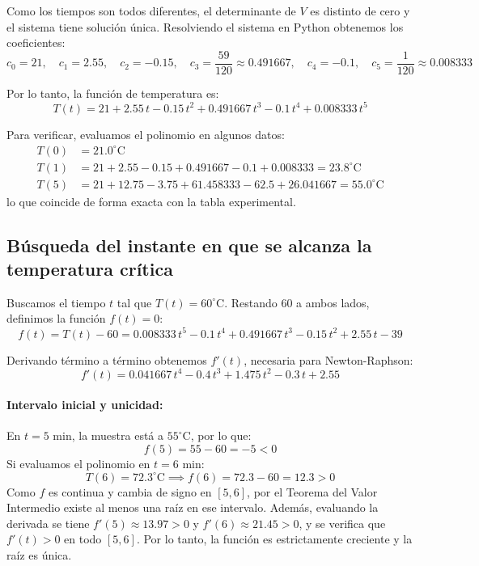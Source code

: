 \documentclass[11pt,a4paper]{article}
\begin{document}
Como los tiempos son todos diferentes, el determinante de $V$ es distinto de cero y el sistema tiene solución única. Resolviendo el sistema en Python obtenemos los coeficientes:
\begin{equation}
    c_0 = 21, \quad c_1 = 2.55, \quad c_2 = -0.15, \quad c_3 = \frac{59}{120} \approx 0.491667, \quad c_4 = -0.1, \quad c_5 = \frac{1}{120} \approx 0.008333
\end{equation}

Por lo tanto, la función de temperatura es:
\begin{equation}
    T(t) = 21 + 2.55\,t - 0.15\,t^2 + 0.491667\,t^3 - 0.1\,t^4 + 0.008333\,t^5
\end{equation}

Para verificar, evaluamos el polinomio en algunos datos:
\begin{align*}
    T(0) &= 21.0^\circ\text{C} \\
    T(1) &= 21 + 2.55 - 0.15 + 0.491667 - 0.1 + 0.008333 = 23.8^\circ\text{C} \\
    T(5) &= 21 + 12.75 - 3.75 + 61.458333 - 62.5 + 26.041667 = 55.0^\circ\text{C}
\end{align*}
lo que coincide de forma exacta con la tabla experimental.

\subsection{Búsqueda del instante en que se alcanza la temperatura crítica}
Buscamos el tiempo $t$ tal que $T(t) = 60^\circ\text{C}$. Restando 60 a ambos lados, definimos la función $f(t) = 0$:
\begin{equation}
    f(t) = T(t) - 60 = 0.008333\,t^5 - 0.1\,t^4 + 0.491667\,t^3 - 0.15\,t^2 + 2.55\,t - 39
\end{equation}

Derivando término a término obtenemos $f'(t)$, necesaria para Newton-Raphson:
\begin{equation}
    f'(t) = 0.041667\,t^4 - 0.4\,t^3 + 1.475\,t^2 - 0.3\,t + 2.55
\end{equation}

\paragraph{Intervalo inicial y unicidad:}
En $t = 5\text{ min}$, la muestra está a $55^\circ\text{C}$, por lo que:
\begin{equation}
    f(5) = 55 - 60 = -5 < 0
\end{equation}
Si evaluamos el polinomio en $t = 6\text{ min}$:
\begin{equation}
    T(6) = 72.3^\circ\text{C} \implies f(6) = 72.3 - 60 = 12.3 > 0
\end{equation}
Como $f$ es continua y cambia de signo en $[5, 6]$, por el Teorema del Valor Intermedio existe al menos una raíz en ese intervalo. Además, evaluando la derivada se tiene $f'(5) \approx 13.97 > 0$ y $f'(6) \approx 21.45 > 0$, y se verifica que $f'(t) > 0$ en todo $[5, 6]$. Por lo tanto, la función es estrictamente creciente y la raíz es única.
\end{document}
